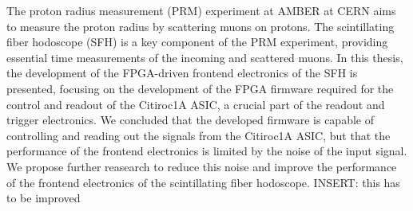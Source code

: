 The proton radius measurement (PRM) experiment at AMBER at CERN aims to measure the proton radius by scattering muons on protons.
The scintillating fiber hodoscope (SFH) is a key component of the PRM experiment, providing essential time measurements of the incoming and scattered muons.
In this thesis, the development of the FPGA-driven frontend electronics of the SFH is presented,
focusing on the development of the FPGA firmware required for the control and readout of the Citiroc1A ASIC, a crucial part of the readout and trigger electronics.
We concluded that the developed firmware is capable of controlling and reading out the signals from the Citiroc1A ASIC,
but that the performance of the frontend electronics is limited by the noise of the input signal.
We propose further reasearch to reduce this noise and improve the performance of the frontend electronics of the scintillating fiber hodoscope.
\newline
INSERT: this has to be improved
